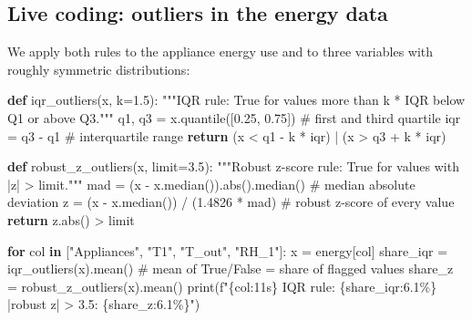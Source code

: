 \documentclass[
  letterpaper,
  DIV=11,
  numbers=noendperiod]{scrreprt}
\newenvironment{Shaded}{\begin{snugshade}}{\end{snugshade}}
\newcommand{\BuiltInTok}[1]{\textcolor[rgb]{0.00,0.23,0.31}{#1}}
\newcommand{\CommentTok}[1]{\textcolor[rgb]{0.37,0.37,0.37}{#1}}
\newcommand{\ControlFlowTok}[1]{\textcolor[rgb]{0.00,0.23,0.31}{\textbf{#1}}}
\newcommand{\FloatTok}[1]{\textcolor[rgb]{0.68,0.00,0.00}{#1}}
\newcommand{\KeywordTok}[1]{\textcolor[rgb]{0.00,0.23,0.31}{\textbf{#1}}}
\newcommand{\NormalTok}[1]{\textcolor[rgb]{0.00,0.23,0.31}{#1}}
\newcommand{\OperatorTok}[1]{\textcolor[rgb]{0.37,0.37,0.37}{#1}}
\newcommand{\SpecialCharTok}[1]{\textcolor[rgb]{0.37,0.37,0.37}{#1}}
\newcommand{\SpecialStringTok}[1]{\textcolor[rgb]{0.13,0.47,0.30}{#1}}
\newcommand{\StringTok}[1]{\textcolor[rgb]{0.13,0.47,0.30}{#1}}
\begin{document}
\subsection{Live coding: outliers in the energy
data}\label{live-coding-outliers-in-the-energy-data}

We apply both rules to the appliance energy use and to three variables
with roughly symmetric distributions:

\begin{Shaded}
\begin{Highlighting}[]
\KeywordTok{def}\NormalTok{ iqr\_outliers(x, k}\OperatorTok{=}\FloatTok{1.5}\NormalTok{):}
    \CommentTok{"""IQR rule: True for values more than k * IQR below Q1 or above Q3."""}
\NormalTok{    q1, q3 }\OperatorTok{=}\NormalTok{ x.quantile([}\FloatTok{0.25}\NormalTok{, }\FloatTok{0.75}\NormalTok{])                }\CommentTok{\# first and third quartile}
\NormalTok{    iqr }\OperatorTok{=}\NormalTok{ q3 }\OperatorTok{{-}}\NormalTok{ q1                                    }\CommentTok{\# interquartile range}
    \ControlFlowTok{return}\NormalTok{ (x }\OperatorTok{\textless{}}\NormalTok{ q1 }\OperatorTok{{-}}\NormalTok{ k }\OperatorTok{*}\NormalTok{ iqr) }\OperatorTok{|}\NormalTok{ (x }\OperatorTok{\textgreater{}}\NormalTok{ q3 }\OperatorTok{+}\NormalTok{ k }\OperatorTok{*}\NormalTok{ iqr)}

\KeywordTok{def}\NormalTok{ robust\_z\_outliers(x, limit}\OperatorTok{=}\FloatTok{3.5}\NormalTok{):}
    \CommentTok{"""Robust z{-}score rule: True for values with |z| \textgreater{} limit."""}
\NormalTok{    mad }\OperatorTok{=}\NormalTok{ (x }\OperatorTok{{-}}\NormalTok{ x.median()).}\BuiltInTok{abs}\NormalTok{().median()            }\CommentTok{\# median absolute deviation}
\NormalTok{    z }\OperatorTok{=}\NormalTok{ (x }\OperatorTok{{-}}\NormalTok{ x.median()) }\OperatorTok{/}\NormalTok{ (}\FloatTok{1.4826} \OperatorTok{*}\NormalTok{ mad)            }\CommentTok{\# robust z{-}score of every value}
    \ControlFlowTok{return}\NormalTok{ z.}\BuiltInTok{abs}\NormalTok{() }\OperatorTok{\textgreater{}}\NormalTok{ limit}

\ControlFlowTok{for}\NormalTok{ col }\KeywordTok{in}\NormalTok{ [}\StringTok{"Appliances"}\NormalTok{, }\StringTok{"T1"}\NormalTok{, }\StringTok{"T\_out"}\NormalTok{, }\StringTok{"RH\_1"}\NormalTok{]:}
\NormalTok{    x }\OperatorTok{=}\NormalTok{ energy[col]}
\NormalTok{    share\_iqr }\OperatorTok{=}\NormalTok{ iqr\_outliers(x).mean()               }\CommentTok{\# mean of True/False = share of flagged values}
\NormalTok{    share\_z }\OperatorTok{=}\NormalTok{ robust\_z\_outliers(x).mean()}
    \BuiltInTok{print}\NormalTok{(}\SpecialStringTok{f"}\SpecialCharTok{\{}\NormalTok{col}\SpecialCharTok{:11s\}}\SpecialStringTok{ IQR rule: }\SpecialCharTok{\{}\NormalTok{share\_iqr}\SpecialCharTok{:6.1\%\}}\SpecialStringTok{   |robust z| \textgreater{} 3.5: }\SpecialCharTok{\{}\NormalTok{share\_z}\SpecialCharTok{:6.1\%\}}\SpecialStringTok{"}\NormalTok{)}
\end{Highlighting}
\end{Shaded}
\end{document}

